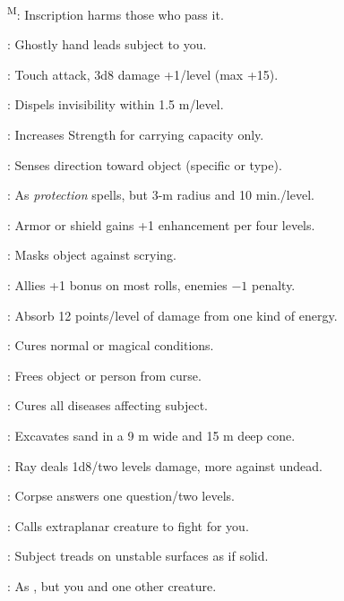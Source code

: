 \textsuperscript{M}: Inscription harms those who pass it.

: Ghostly hand leads subject to you.

: Touch attack, 3d8 damage +1/level (max +15).

: Dispels invisibility within 1.5 m/level.

: Increases Strength for carrying capacity only. %

: Senses direction toward object (specific or type).

: As \emph{protection} spells, but 3-m radius and 10 min./level.

: Armor or shield gains +1 enhancement per four levels.


: Masks object against scrying.

: Allies +1 bonus on most rolls, enemies $-1$ penalty.

: Absorb 12 points/level of damage from one kind of energy.

: Cures normal or magical conditions.

: Frees object or person from curse.

: Cures all diseases affecting subject.

: Excavates sand in a 9 m wide and 15 m deep cone. %

: Ray deals 1d8/two levels damage, more against undead.

: Corpse answers one question/two levels.


: Calls extraplanar creature to fight for you.

: Subject treads on unstable surfaces as if solid. %

: As , but you and one other creature.


